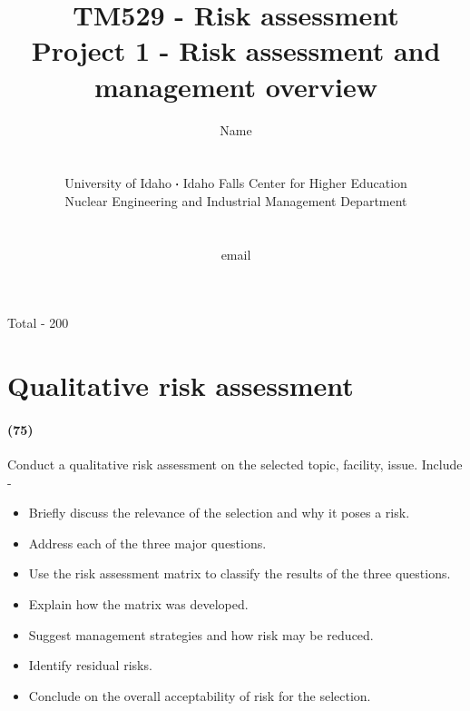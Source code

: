 \documentclass[11pt,a4paper]{article}
\newcommand*\sq{\mathbin{\vcenter{\hbox{\rule{.3ex}{.3ex}}}}} %
\begin{document}
\begin{titlepage}
    \title{
        TM529 - Risk assessment\\
        Project 1 - Risk assessment and management overview\\
    }
    \author{
        Name
        \\ \\ \\
        University of Idaho $\sq$ Idaho Falls Center for Higher Education\\
        Nuclear Engineering and Industrial Management Department
        \\ \\ \\
        email 
    }
\clearpage %
\maketitle
\vspace*{\fill}
\begin{flushright}{
        Total - 200
}
\end{flushright}
\thispagestyle{empty} %
\end{titlepage}

\printnoidxglossary

\newpage

\section{Qualitative risk assessment}
\paragraph*{(75)}
Conduct a qualitative risk assessment on the selected topic, facility, issue. Include - 
\begin{itemize}[leftmargin=*,topsep=-1ex,itemsep=-1ex,partopsep=1ex,parsep=1ex,font=\bfseries]
    \item Briefly discuss the relevance of the selection and why it poses a risk.
    \item Address each of the three major questions.
    \item Use the risk assessment matrix to classify the results of the three questions.
    \item Explain how the matrix was developed.
    \item Suggest management strategies and how risk may be reduced.
    \item Identify residual risks.
    \item Conclude on the overall acceptability of risk for the selection.
\end{itemize}
\end{document}
